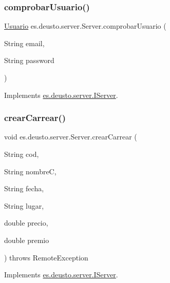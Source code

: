 \subsubsection{\texorpdfstring{comprobarUsuario()}{comprobarUsuario()}}
{\footnotesize\ttfamily \mbox{\hyperlink{classes_1_1deusto_1_1server_1_1jdo_1_1_usuario}{Usuario}} es.\+deusto.\+server.\+Server.\+comprobar\+Usuario (\begin{DoxyParamCaption}\item[{String}]{email,  }\item[{String}]{password }\end{DoxyParamCaption})}



Implements \mbox{\hyperlink{interfacees_1_1deusto_1_1server_1_1_i_server_a864d05d99ec3891208c39d8352221656}{es.\+deusto.\+server.\+I\+Server}}.

\mbox{\label{classes_1_1deusto_1_1server_1_1_server_a22d31cd9642f978f1995fc7822d99258}} 
\subsubsection{\texorpdfstring{crearCarrear()}{crearCarrear()}}
{\footnotesize\ttfamily void es.\+deusto.\+server.\+Server.\+crear\+Carrear (\begin{DoxyParamCaption}\item[{String}]{cod,  }\item[{String}]{nombreC,  }\item[{String}]{fecha,  }\item[{String}]{lugar,  }\item[{double}]{precio,  }\item[{double}]{premio }\end{DoxyParamCaption}) throws Remote\+Exception}



Implements \mbox{\hyperlink{interfacees_1_1deusto_1_1server_1_1_i_server_a3cb0049dde89f2d81fcc883b19a0c6cf}{es.\+deusto.\+server.\+I\+Server}}.

\mbox{\label{classes_1_1deusto_1_1server_1_1_server_a19df52b26da7c83b2e7f13a6aab45633}} 
